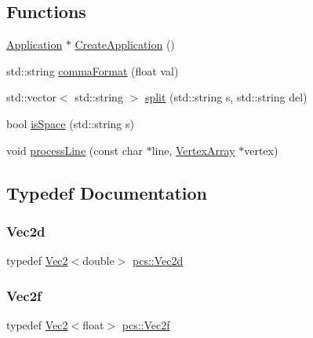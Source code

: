 \subsection*{Functions}
\begin{DoxyCompactItemize}
\item 
\hyperlink{classpcs_1_1Application}{Application} $\ast$ \hyperlink{namespacepcs_ac505f1571e4369cb8eaaca3a788979c8}{Create\+Application} ()
\item 
std\+::string \hyperlink{namespacepcs_adc528f7cec12c6ab69fbbea0ac3c7fe4}{comma\+Format} (float val)
\item 
std\+::vector$<$ std\+::string $>$ \hyperlink{namespacepcs_ae6afa19b12671174ac5dc55535ff674d}{split} (std\+::string s, std\+::string del)
\item 
bool \hyperlink{namespacepcs_aaa3406145d29fc28767406a54dbfc2f8}{is\+Space} (std\+::string s)
\item 
void \hyperlink{namespacepcs_a5246f80f28a5fa413f1ae594eb55daf9}{process\+Line} (const char $\ast$line, \hyperlink{classpcs_1_1VertexArray}{Vertex\+Array} $\ast$vertex)
\end{DoxyCompactItemize}


\subsection{Typedef Documentation}
\mbox{\label{namespacepcs_acc216b704c01ee5f725075dabe53e085}} 
\subsubsection{\texorpdfstring{Vec2d}{Vec2d}}
{\footnotesize\ttfamily typedef \hyperlink{structpcs_1_1Vec2}{Vec2}$<$double$>$ \hyperlink{namespacepcs_acc216b704c01ee5f725075dabe53e085}{pcs\+::\+Vec2d}}

\mbox{\label{namespacepcs_a4b2fd718bd0800b6aa492b1c60f19edc}} 
\subsubsection{\texorpdfstring{Vec2f}{Vec2f}}
{\footnotesize\ttfamily typedef \hyperlink{structpcs_1_1Vec2}{Vec2}$<$float$>$ \hyperlink{namespacepcs_a4b2fd718bd0800b6aa492b1c60f19edc}{pcs\+::\+Vec2f}}

